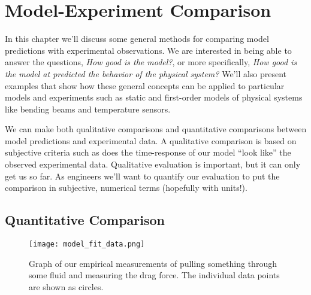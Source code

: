 \chapter{Model-Experiment Comparison}\label{c:compare}

In this chapter we'll discuss some general methods for comparing model predictions with experimental observations.  We are interested in being able to answer the questions, \emph{How good is the model?}, or more specifically, \emph{How good is the model at predicted the behavior of the physical system?}  We'll also present examples that show how these general concepts can be applied to particular models and experiments such as static and first-order models of physical systems like bending beams and temperature sensors.

We can make both \glspl{qualitative comparison} and \glspl{quantitative comparison} between model predictions and experimental data.  A qualitative comparison is based on subjective criteria such as does the time-response of our model ``look like'' the observed experimental data.  Qualitative evaluation is important, but it can only get us so far. As engineers we'll want to quantify our evaluation to put the comparison in subjective, numerical terms (hopefully with units!).  


\section{Quantitative Comparison}

\renewcommand{\ThisFigWidth}{0.3}
\begin{figure}[th!]
\centering
\texttt{[image: model\_fit\_data.png]}
\caption{Graph of our empirical measurements of pulling something through some fluid and measuring the drag force.  The individual data points are shown as circles.}
\label{f:modeldata}
\end{figure}

